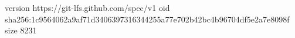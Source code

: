 version https://git-lfs.github.com/spec/v1
oid sha256:1c9564062a9af71d3406397316344255a77e702b42bc4b96704df5e2a7e8098f
size 8231
